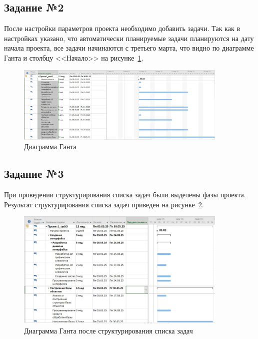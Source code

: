 \subsection{Задание №2}

После настройки параметров проекта необходимо добавить задачи.
Так как в настройках указано, что автоматически планируемые задачи планируются на дату начала проекта, все задачи начинаются с третьего марта, что видно по диаграмме Ганта и столбцу <<Начало>> на рисунке~\ref{fig:task2}.

\begin{figure}[H]
	\centering
	\includegraphics[width=0.9\textwidth]{img/lab1/task2/tasks.jpg}
	\caption{Диаграмма Ганта}
	\label{fig:task2}
\end{figure}

\subsection{Задание №3}

При проведении структурирования списка задач были выделены фазы проекта.
Результат структурирования списка задач приведен на рисунке~\ref{fig:task3}.

\begin{figure}[H]
	\centering
	\includegraphics[width=0.9\textwidth]{img/lab1/task3/task3.jpg}
	\caption{Диаграмма Ганта после структурирования списка задач}
	\label{fig:task3}
\end{figure}

